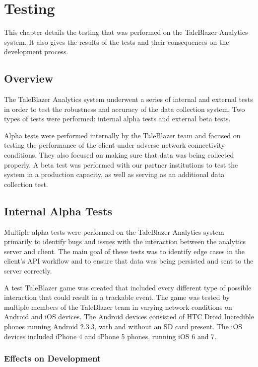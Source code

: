 \chapter{Testing}

This chapter details the testing that was performed on the TaleBlazer Analytics system. It also gives the results of the tests and their consequences on the development process. 

\section{Overview}

The TaleBlazer Analytics system underwent a series of internal and external tests in order to test the robustness and accuracy of the data collection system. Two types of tests were performed: internal alpha tests and external beta tests. 

Alpha tests were performed internally by the TaleBlazer team and focused on testing the performance of the client under adverse network connectivity conditions. They also focused on making sure that data was being collected properly. A beta test was performed with our partner institutions to test the system in a production capacity, as well as serving as an additional data collection test. 

\section{Internal Alpha Tests}

Multiple alpha tests were performed on the TaleBlazer Analytics system primarily to identify bugs and issues with the interaction between the analytics server and client. The main goal of these tests was to identify edge cases in the client's API workflow and to ensure that data was being persisted and sent to the server correctly. 

A test TaleBlazer game was created that included every different type of possible interaction that could result in a trackable event. The game was tested by multiple members of the TaleBlazer team in varying network conditions on Android and iOS devices. The Android devices consisted of HTC Droid Incredible phones running Android 2.3.3, with and without an SD card present. The iOS devices included iPhone 4 and iPhone 5 phones, running iOS 6 and 7. 

\subsection{Effects on Development}


